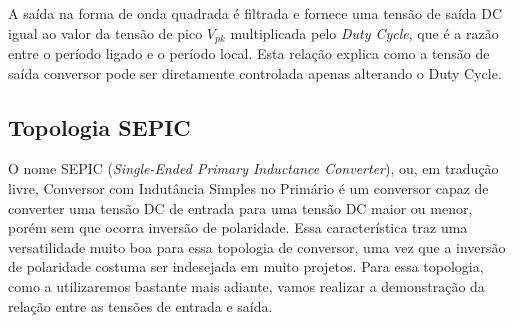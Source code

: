 \noindent
\begin{minipage}{\linewidth}
\label{PWM_sample_fig}
\end{minipage}

A saída na forma de onda quadrada é filtrada e fornece uma tensão de saída DC igual ao valor da tensão de pico $V_{pk}$ multiplicada pelo \textit{Duty Cycle}, que é a razão entre o período ligado e o período local. Esta relação explica como a tensão de saída conversor pode ser diretamente controlada apenas alterando o Duty Cycle.  

\subsection*{Topologia SEPIC}
O nome SEPIC (\textit{Single-Ended Primary Inductance Converter}), ou, em tradução livre, Conversor com Indutância Simples no Primário é um conversor capaz de converter uma tensão DC de entrada para uma tensão DC maior ou menor, porém sem que ocorra inversão de polaridade. Essa característica traz uma versatilidade muito boa para essa topologia de conversor, uma vez que a inversão de polaridade costuma ser indesejada em muito projetos.  Para essa topologia, como a utilizaremos bastante mais adiante, vamos realizar a demonstração da relação entre as tensões de entrada e saída.   

\noindent
\begin{minipage}{\linewidth}
\label{sepic_topology_sample}
\end{minipage}

